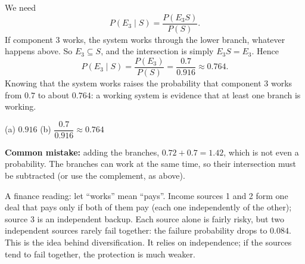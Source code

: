 \begin{solution}
	 We need
	\[ P(E_3\mid S)=\frac{P(E_3S)}{P(S)}. \]
	If component 3 works, the system works through the lower branch, whatever
	happens above. So $E_3\subseteq S$, and the intersection is simply
	$E_3S=E_3$. Hence
	\[ P(E_3\mid S)=\frac{P(E_3)}{P(S)}=\frac{0.7}{0.916}\approx0.764. \]
	Knowing that the system works raises the probability that component 3
	works from $0.7$ to about $0.764$: a working system is evidence that at
	least one branch is working.
	\begin{answer}
		(a) $0.916$ \quad (b) $\dfrac{0.7}{0.916}\approx0.764$
	\end{answer}
	\begin{remark}
		\textbf{Common mistake:} adding the branches, $0.72+0.7=1.42$, which is
		not even a probability. The branches can work at the same time, so their
		intersection must be subtracted (or use the complement, as above).

		A finance reading: let ``works'' mean ``pays''. Income sources 1 and 2
		form one deal that pays only if both of them pay (each one
		independently of the other); source 3 is an independent backup. Each source alone is fairly risky, but two
		independent sources rarely fail together: the failure probability drops
		to $0.084$. This is the idea behind diversification. It relies on
		independence; if the sources tend to fail together, the protection is
		much weaker.
	\end{remark}
\end{solution}
